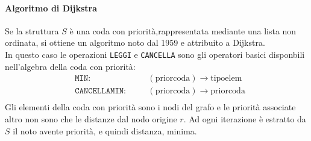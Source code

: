 \documentclass[12pt]{report}
\begin{document}
  \paragraph{Algoritmo di Dijkstra}
  Se la struttura $S$ è una coda con priorità,rappresentata mediante una lista non ordinata, si ottiene un algoritmo noto dal 1959 e attribuito a Dijkstra. \\
  In questo caso le operazioni \texttt{LEGGI} e \texttt{CANCELLA} sono gli operatori basici disponbili nell'algebra della coda con priorità:
  \begin{align*}
  	&\texttt{MIN:} &\quad &(\text{priorcoda}) \to \text{tipoelem} \\
  	&\texttt{CANCELLAMIN:} &\quad &(\text{priorcoda}) \to \text{priorcoda} \\
  \end{align*}
  Gli elementi della coda con priorità sono i nodi del grafo e le priorità associate altro non sono che le distanze dal nodo origine $r$. Ad ogni iterazione è estratto da $S$ il noto avente priorità, e quindi distanza, minima.
\end{document}
